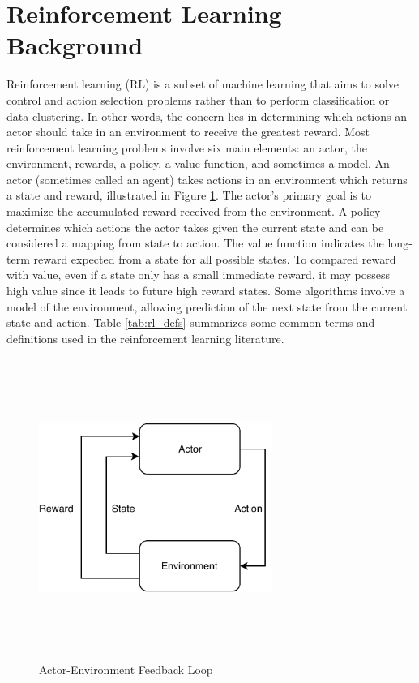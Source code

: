 \section{Reinforcement Learning Background}
Reinforcement learning (RL) is a subset of machine learning that aims to solve control and action selection problems rather than to perform classification or data clustering. In other words, the concern lies in determining which actions an actor should take in an environment to receive the greatest reward. Most reinforcement learning problems involve six main elements: an actor, the environment, rewards, a policy, a value function, and sometimes a model. An actor (sometimes called an agent) takes actions in an environment which returns a state and reward, illustrated in Figure \ref{fig:actor_env_loop}. The actor's primary goal is to maximize the accumulated reward received from the environment. A policy determines which actions the actor takes given the current state and can be considered a mapping from state to action. The value function indicates the long-term reward expected from a state for all possible states. To compared reward with value, even if a state only has a small immediate reward, it may possess high value since it leads to future high reward states. Some algorithms involve a model of the environment, allowing prediction of the next state from the current state and action. Table \ref{tab:rl_defs} summarizes some common terms and definitions used in the reinforcement learning literature.
\begin{figure}[H]   %
	\centering \includegraphics[width=3in, height=3.85in, keepaspectratio]{figures/actor_env_loop.pdf}
	\caption{Actor-Environment Feedback Loop}\label{fig:actor_env_loop}
\end{figure}

